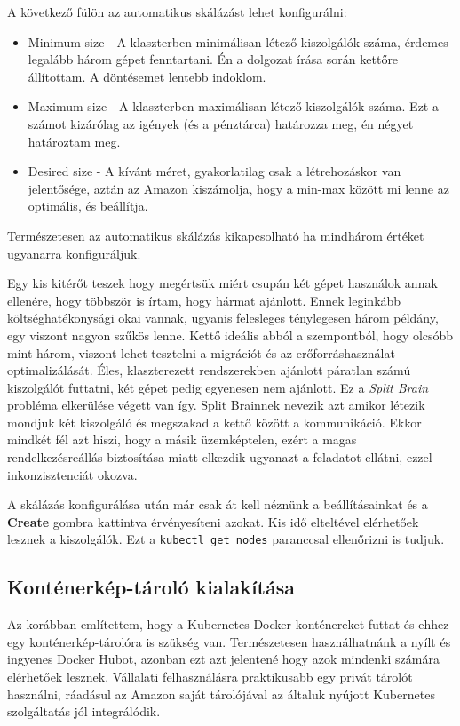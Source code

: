 A következő fülön az automatikus skálázást lehet konfigurálni:
\begin{itemize}
    \item Minimum size - A klaszterben minimálisan létező kiszolgálók száma, érdemes legalább három gépet fenntartani. Én a dolgozat írása során kettőre állítottam. A döntésemet lentebb indoklom.
    \item Maximum size - A klaszterben maximálisan létező kiszolgálók száma. Ezt a számot kizárólag az igények (és a pénztárca) határozza meg, én négyet határoztam meg.
    \item Desired size - A kívánt méret, gyakorlatilag csak a létrehozáskor van jelentősége, aztán az Amazon kiszámolja, hogy a min-max között mi lenne az optimális, és beállítja.
\end{itemize}
Természetesen az automatikus skálázás kikapcsolható ha mindhárom értéket ugyanarra konfiguráljuk.

Egy kis kitérőt teszek hogy megértsük miért csupán két gépet használok annak ellenére, hogy többször is írtam, hogy hármat ajánlott. Ennek leginkább költséghatékonysági okai vannak, ugyanis felesleges ténylegesen három példány, egy viszont nagyon szűkös lenne. Kettő ideális abból a szempontból, hogy olcsóbb mint három, viszont lehet tesztelni a migrációt és az erőforráshasználat optimalizálását. Éles, klaszterezett rendszerekben ajánlott páratlan számú kiszolgálót futtatni, két gépet pedig egyenesen nem ajánlott. Ez a \textit{Split Brain} probléma elkerülése végett van így. Split Brainnek nevezik azt amikor létezik mondjuk két kiszolgáló és megszakad a kettő között a kommunikáció. Ekkor mindkét fél azt hiszi, hogy a másik üzemképtelen, ezért a magas rendelkezésreállás biztosítása miatt elkezdik ugyanazt a feladatot ellátni, ezzel inkonzisztenciát okozva.

A skálázás konfigurálása után már csak át kell néznünk a beállításainkat és a \textbf{Create} gombra kattintva érvényesíteni azokat. Kis idő elteltével elérhetőek lesznek a kiszolgálók. Ezt a \lstinline{kubectl get nodes} paranccsal ellenőrizni is tudjuk.
\subsection{Konténerkép-tároló kialakítása}
Az korábban említettem, hogy a Kubernetes Docker konténereket futtat és ehhez egy konténerkép-tárolóra is szükség van. Természetesen használhatnánk a nyílt és ingyenes Docker Hubot, azonban ezt azt jelentené hogy azok mindenki számára elérhetőek lesznek. Vállalati felhasználásra praktikusabb egy privát tárolót használni, ráadásul az Amazon saját tárolójával az általuk nyújott Kubernetes szolgáltatás jól integrálódik.

